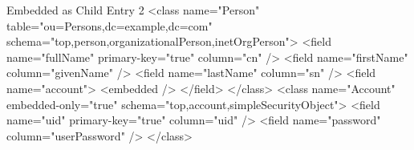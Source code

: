 \documentclass[a4paper,11pt,oneside]{article}
\begin{document}
\begin{SaveVerbatim}{Embedded as Child Entry 2}
<class name="Person" table="ou=Persons,dc=example,dc=com" 
       schema="top,person,organizationalPerson,inetOrgPerson">
    <field name="fullName" primary-key="true" column="cn" />
    <field name="firstName" column="givenName" />
    <field name="lastName" column="sn" />
    <field name="account">
        <embedded />
    </field>
</class>
<class name="Account" embedded-only="true" schema="top,account,simpleSecurityObject">
    <field name="uid" primary-key="true" column="uid" />
    <field name="password" column="userPassword" />
</class>
\end{SaveVerbatim}
\begin{figure}[htb]
\end{figure}
\end{document}
